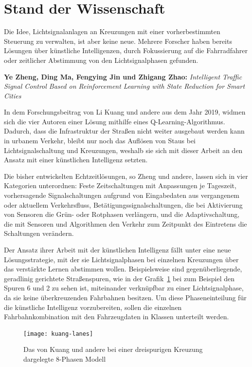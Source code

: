 %
%


\section{Stand der Wissenschaft}\label{sec:state-of-science}

Die Idee, Lichtsignalanlagen an Kreuzungen mit einer vorherbestimmten Steuerung zu verwalten, ist aber keine neue.
Mehrere Forscher haben bereits Lösungen über künstliche Intelligenzen, durch Fokussierung auf die Fahrradfahrer oder zeitlicher Abstimmung von den Lichtsignalphasen gefunden.

\textbf{Ye Zheng, Ding Ma, Fengying Jin und Zhigang Zhao:}
\textit{Intelligent Traffic Signal Control Based on Reinforcement Learning with State Reduction for Smart Cities}

In dem Forschungsbeitrag von Li Kuang und andere aus dem Jahr 2019, widmen sich die vier Autoren einer Lösung mithilfe eines Q-Learning-Algorithmus.
Dadurch, dass die Infrastruktur der Straßen nicht weiter ausgebaut werden kann in urbanem Verkehr, bleibt nur noch das Auflösen von Staus bei Lichtsignalschaltung und Kreuzungen\cite{Zheng2019}, weshalb sie sich mit dieser Arbeit an den Ansatz mit einer künstlichen Intelligenz setzten.

Die bisher entwickelten Echtzeitlösungen, so Zheng und andere, lassen sich in vier Kategorien unterordnen:
Feste Zeitschaltungen mit Anpassungen je Tageszeit, vorhersagende Signalschaltungen aufgrund von Eingabedaten aus vergangenem oder aktuellem Verkehrsfluss, Betätigungssignalschaltungen, die bei Aktivierung von Sensoren die Grün- oder Rotphasen verlängern, und die Adaptivschaltung, die mit Sensoren und Algorithmen den Verkehr zum Zeitpunkt des Eintretens die Schaltungen verändern\cite{Zheng2019}.

Der Ansatz ihrer Arbeit mit der künstlichen Intelligenz fällt unter eine neue Lösungsstrategie, mit der sie Lichtsignalphasen bei einzelnen Kreuzungen über das verstärkte Lernen abstimmen wollen\cite{Zheng2019}.
Beispielsweise sind gegenüberliegende, geradlinig gerichtete Straßenspuren, wie in der Grafik~\ref{fig:kuang-lanes} bei zum Beispiel den Spuren 6 und 2 zu sehen ist, miteinander verknüpfbar zu einer Lichtsignalphase, da sie keine überkreuzenden Fahrbahnen besitzen.
Um diese Phaseneinteilung für die künstliche Intelligenz vorzubereiten, sollen die einzelnen Fahrbahnkombination mit den Fahrzeugdaten in Klassen unterteilt werden\cite{Zheng2019}.

\begin{figure}[h]
    \centering
    \texttt{[image: kuang-lanes]}~\caption{Das von Kuang und andere bei einer dreispurigen Kreuzung dargelegte 8-Phasen Modell~\cite{Zheng2019}}
    \label{fig:kuang-lanes}
\end{figure}

